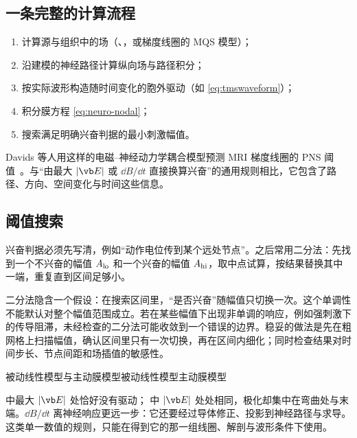 \subsection{一条完整的计算流程}
\begin{enumerate}
\item 计算源与组织中的场（、，或梯度线圈的 MQS 模型）；
\item 沿建模的神经路径计算纵向场与路径积分；
\item 按实际波形构造随时间变化的胞外驱动（如 \eqref{eq:tmswaveform}）；
\item 积分膜方程 \eqref{eq:neuro-nodal}；
\item 搜索满足明确兴奋判据的最小刺激幅值。
\end{enumerate}
Davids 等人用这样的电磁--神经动力学耦合模型预测 MRI 梯度线圈的 PNS 阈值~\cite{davids}。与“由最大 $|\vb E|$ 或 $\dd B/\dd t$ 直接换算兴奋”的通用规则相比，它包含了路径、方向、空间变化与时间这些信息。

\subsection{阈值搜索}
兴奋判据必须先写清，例如“动作电位传到某个远处节点”。之后常用二分法：先找到一个不兴奋的幅值 $A_{\rm lo}$ 和一个兴奋的幅值 $A_{\rm hi}$，取中点试算，按结果替换其中一端，重复直到区间足够小。

二分法隐含一个假设：在搜索区间里，“是否兴奋”随幅值只切换一次。这个单调性不能默认对整个幅值范围成立。若在某些幅值下出现非单调的响应，例如强刺激下的传导阻滞，未经检查的二分法可能收敛到一个错误的边界。稳妥的做法是先在粗网格上扫描幅值，确认区间里只有一次切换，再在区间内细化；同时检查结果对时间步长、节点间距和场插值的敏感性。

\begin{compare}{被动线性模型与主动膜模型}{被动线性模型}{主动膜模型}
\end{compare}

\begin{pitfall}[“最大 $|\vb E|$（或 $\dd B/\dd t$）超过某个数就会兴奋”]
 中最大 $|\vb E|$ 处恰好没有驱动； 中 $|\vb E|$ 处处相同，极化却集中在弯曲处与末端。$\dd B/\dd t$ 离神经响应更远一步：它还要经过导体修正、投影到神经路径与求导。这类单一数值的规则，只能在得到它的那一组线圈、解剖与波形条件下使用。
\end{pitfall}

